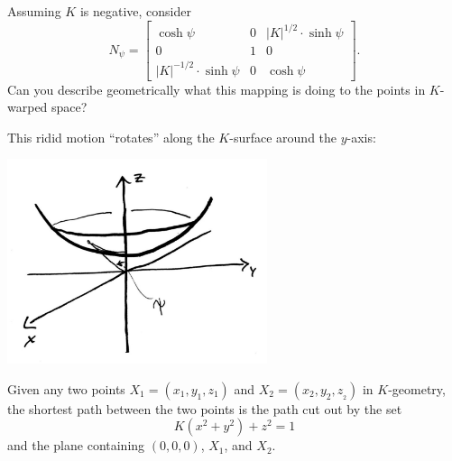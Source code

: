 \documentclass{ximera}
\begin{document}
\begin{problem}
  Assuming $K$ is negative, consider
  \[
  N_\psi=
  \begin{bmatrix}
    \cosh\psi & 0 & |K|^{1/2}\cdot\sinh\psi\\
    0 & 1 & 0\\
    |K|^{-1/2}\cdot\sinh\psi & 0 & \cosh\psi
  \end{bmatrix}.
  \]
  Can you describe geometrically what this mapping is doing to the
  points in $K$-warped space?
  \begin{freeResponse}
    This ridid motion ``rotates'' along the $K$-surface around the $y$-axis:
    \begin{image}
      \includegraphics[width=3in]{hyperRigidMotion.jpg}
    \end{image}
  \end{freeResponse}
\end{problem}


\begin{theorem}
Given any two points $X_{1}=\left(x_{1},y_{1},z_{1}\right) $ and
$X_{2}=\left(x_{2},y_{2},z_{_{2}}\right) $ in $K$-geometry, the
shortest path between the two points is the path cut out by the set
\[
K\left(  x^{2}+y^{2}\right)  +z^{2}=1
\]
and the plane containing $(0,0,0)$, $X_{1}$, and $X_{2}$.
\end{theorem}
\end{document}
